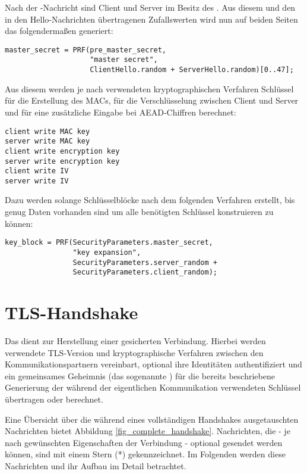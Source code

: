 Nach der \clientkeyexchange{}-Nachricht sind Client und Server im Besitz des \premastersecret{}. Aus diesem und den in den Hello-Nachrichten übertragenen Zufallswerten wird nun auf beiden Seiten das \mastersecret{} folgendermaßen generiert:

\begin{lstlisting}
master_secret = PRF(pre_master_secret, 
					"master secret",
					ClientHello.random + ServerHello.random)[0..47];
\end{lstlisting}

Aus diesem \mastersecret{} werden je nach verwendeten kryptographischen Verfahren Schlüssel für die Erstellung des MACs, für die Verschlüsselung zwischen Client und Server und für eine zusätzliche Eingabe bei AEAD-Chiffren berechnet:
\begin{lstlisting}
client write MAC key
server write MAC key
client write encryption key
server write encryption key
client write IV
server write IV
\end{lstlisting}

Dazu werden solange Schlüsselblöcke nach dem folgenden Verfahren erstellt, bis genug Daten vorhanden sind um alle benötigten Schlüssel konstruieren zu können: 

\begin{lstlisting}
key_block = PRF(SecurityParameters.master_secret,
                "key expansion",
                SecurityParameters.server_random +
                SecurityParameters.client_random);
\end{lstlisting}


\section{TLS-Handshake}

\label{sec_tls_handshake}

Das \handshakeprotocol{} dient zur Herstellung einer gesicherten Verbindung. Hierbei werden verwendete TLS-Version und kryptographische Verfahren zwischen den Kommunikationspartnern vereinbart, optional ihre Identitäten authentifiziert und ein gemeinsames Geheimnis (das sogenannte \premastersecret{}) für die bereits beschriebene Generierung der während der eigentlichen Kommunikation verwendeten Schlüssel übertragen oder berechnet. 

Eine Übersicht über die während eines vollständigen Handshakes ausgetauschten Nachrichten bietet Abbildung \ref{fig_complete_handshake}. Nachrichten, die - je nach gewünschten Eigenschaften der Verbindung - optional gesendet werden können, sind mit einem Stern (*) gekennzeichnet. Im Folgenden werden diese Nachrichten und ihr Aufbau im Detail betrachtet.

